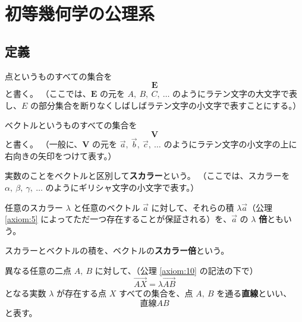\chapter{初等幾何学の公理系}

\section{定義}

\begin{dfn}[\(\bm{E}\)]\label{definition:1}
  点というものすべての集合を
  \[\bm{E}\]
  と書く。
  （ここでは、\(\bm{E}\) の元を \(A,\ B,\ C,\ \ldots\) のようにラテン文字の大文字で表し、\(E\) の部分集合を断りなくしばしばラテン文字の小文字で表すことにする。）
\end{dfn}

\begin{dfn}[\(\bm{V}\)]\label{definition:2}
  ベクトルというものすべての集合を
  \[\bm{V}\]
  と書く。
  （一般に、\(\bm{V}\) の元を \(\vec{a},\ \vec{b},\ \vec{c},\ \ldots\) のようにラテン文字の小文字の上に右向きの矢印をつけて表す。）
\end{dfn}

\begin{dfn}[スカラー]\label{definition:3}
  実数のことをベクトルと区別して\textbf{スカラー}という。
  （ここでは、スカラーを \(\alpha,\ \beta,\ \gamma,\ \ldots\) のようにギリシャ文字の小文字で表す。）
\end{dfn}

\begin{dfn}[倍]\label{definition:4}
  任意のスカラー \(\lambda\) と任意のベクトル \(\vec{a}\) に対して、それらの積 \(\lambda\vec{a}\)（公理 \ref{axiom:5} によってただ一つ存在することが保証される）を、\(\vec{a}\) の \(\lambda\) \textbf{倍}ともいう。
\end{dfn}

\begin{dfn}[スカラー倍]\label{definition:5}
  スカラーとベクトルの積を、ベクトルの\textbf{スカラー倍}という。
\end{dfn}

\begin{dfn}[直線、端点]\label{definition:6}
  異なる任意の二点 \(A,\ B\) に対して、（公理 \ref{axiom:10} の記法の下で）
  \[\overrightarrow{AX}=\lambda\overrightarrow{AB}\]
  となる実数 \(\lambda\) が存在する点 \(X\) すべての集合を、点 \(A,\ B\) を通る\textbf{直線}といい、
  \[\text{直線} AB\]
   と表す。
\end{dfn}

